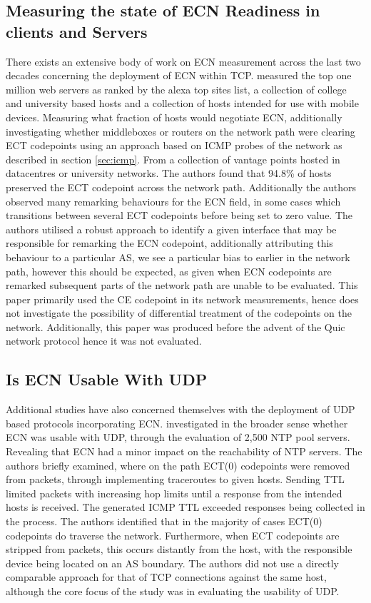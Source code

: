 \documentclass{l4proj}
\begin{document}
\subsection{Measuring the state of ECN Readiness in clients and Servers}


There exists an extensive body of work on ECN measurement across the last two decades concerning the deployment of ECN within TCP. \cite{bauer_measuring_2011} measured the top one million web servers as ranked by the alexa top sites list, a collection of college and university based hosts and a collection of hosts intended for use with mobile devices. Measuring what fraction of hosts would negotiate ECN, additionally investigating whether middleboxes or routers on the network path were clearing ECT codepoints using an approach based on ICMP probes of the network as described in section \ref{sec:icmp}. From a collection of vantage points hosted in datacentres or university networks. The authors found that 94.8\% of hosts preserved the ECT codepoint across the network path. Additionally the authors observed many remarking behaviours for the ECN field, in some cases which transitions between several ECT codepoints before being set to zero value. The authors utilised a robust approach to identify a given interface that may be responsible for remarking the ECN codepoint, additionally attributing this behaviour to a particular AS, we see a particular bias to earlier in the network path, however this should be expected, as given when ECN codepoints are remarked subsequent parts of the network path are unable to be evaluated. This paper primarily used the CE codepoint in its network measurements, hence does not investigate the possibility of differential treatment of the codepoints on the network. Additionally, this paper was produced before the advent of the Quic network protocol hence it was not evaluated.


\subsection{Is ECN Usable With UDP}

Additional studies have also concerned themselves with the deployment of UDP based protocols incorporating ECN. \cite{mcquistin_is_2015} investigated in the broader sense whether ECN was usable with UDP, through the evaluation of 2,500 NTP pool servers. Revealing that ECN had a minor impact on the reachability of NTP servers. The authors briefly examined, where on the path ECT(0) codepoints were removed from packets, through implementing traceroutes to given hosts. Sending TTL limited packets with increasing hop limits until a response from the intended hosts is received. The generated ICMP TTL exceeded responses being collected in the process. The authors identified that in the majority of cases ECT(0) codepoints do traverse the network. Furthermore, when ECT codepoints are stripped from packets, this occurs distantly from the host, with the responsible device being located on an AS boundary. The authors did not use a directly comparable approach for that of TCP connections against the same host, although the core focus of the study was in evaluating the usability of UDP.
\end{document}
